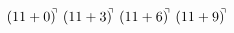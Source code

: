 \documentclass[preview]{standalone}
\begin{document}
\begin{align*}
(11+0)^{\hspace{-0.1cm}\urcorner} \ (11+3)^{\hspace{-0.1cm}\urcorner} \ (11+6)^{\hspace{-0.1cm}\urcorner} \ (11+9)^{\hspace{-0.1cm}\urcorner}
\end{align*}
\end{document}
